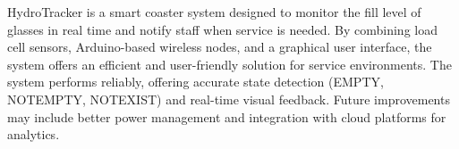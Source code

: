 HydroTracker is a smart coaster system designed to monitor the fill level of glasses in real time and notify staff when service is needed. By combining load cell sensors, Arduino-based wireless nodes, and a graphical user interface, the system offers an efficient and user-friendly solution for service environments.
The system performs reliably, offering accurate state detection (EMPTY, NOTEMPTY, NOTEXIST) and real-time visual feedback. Future improvements may include better power management and integration with cloud platforms for analytics.